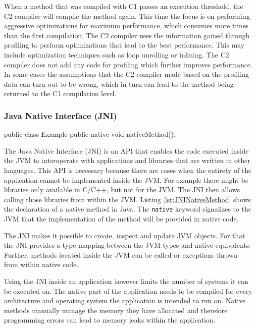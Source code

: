 When a method that was compiled with C1 passes an execution threshold, the C2 compiler will compile the method again. This time the focus is on performing aggressive optimizations for maximum performance, which consumes more times than the first compilation. The C2 compiler uses the information gained through profiling to perform optimizations that lead to the best performance. This may include optimization techniques such as loop unrolling or inlining. The C2 compiler does not add any code for profiling which further improves performance. In some cases the assumptions that the C2 compiler made based on the profiling data can turn out to be wrong, which in turn can lead to the method being returned to the C1 compilation level.

\subsubsection{Java Native Interface (JNI)}


\begin{JavaCode}[float,numbers=none,caption=Declaration of a native method in Java., label=lst:JNINativeMethod]
    public class Example {
        public native void nativeMethod();
    }
\end{JavaCode}


The Java Native Interface (JNI) is an API that enables the code executed inside the JVM to interoperate with applications and libraries that are written in other languages. This API is necessary because there are cases when the entirety of the application cannot be implemented inside the JVM. For example there might be libraries only available in C/C++, but not for the JVM. The JNI then allows calling those libraries from within the JVM. Listing \ref{lst:JNINativeMethod} shows the declaration of a native method in Java. The \texttt{native} keyword signalizes to the JVM that the implementation of the method will be provided in native code.


The JNI makes it possible to create, inspect and update JVM objects. For that the JNI provides a type mapping between the JVM types and native equivalents. Further, methods located inside the JVM can be called or exceptions thrown from within native code.

Using the JNI inside an application however limits the number of systems it can be executed on. The native part of the application needs to be compiled for every architecture and operating system the application is intended to run on. Native methods manually manage the memory they have allocated and therefore programming errors can lead to memory leaks within the application.  